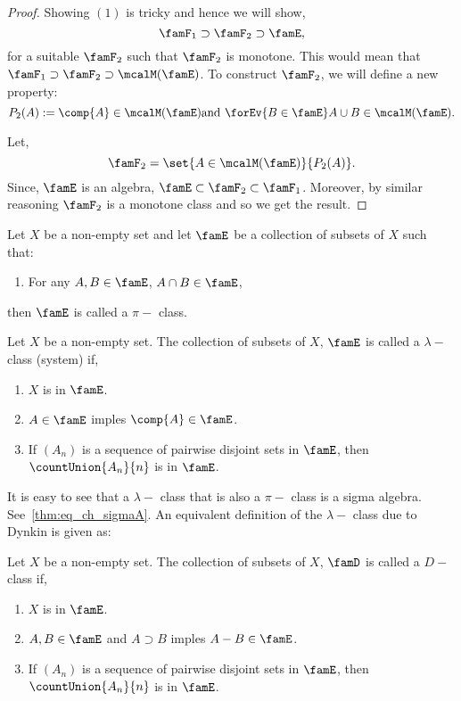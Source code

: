 \begin{proof}
    Showing $(1)$ is tricky and hence we will show,
    \[\famF_1 \supset \famF_2 \supset \famE,\]
    for a suitable $\famF_2$ such that $\famF_2$ is monotone. 
    This would mean that $\famF_1 \supset \famF_2 \supset \mcalM(\famE)$.
    To construct $\famF_2$, we will define a new property:
    \[P_2(A) := \comp{A}\in\mcalM(\famE) \text{and} \hspace{0.05in} 
	\forEv{B\in\famE}A\cup B \in\mcalM(\famE).\]

    Let,
    \[\famF_{2} = \set{A\in\mcalM(\famE)}{P_2(A)}.\]
    Since, $\famE$ is an algebra, $\famE \subset \famF_{2} \subset \famF_{1}$. Moreover, by similar reasoning
    $\famF_{2}$ is a monotone class and so we get the result.
\end{proof}

\begin{Definition}[name=$\pi$ class]
    Let $X$ be a non-empty set and let $\famE$ be a collection of subsets of $X$ such that:
    \begin{enumerate}
	\item For any $A,B \in \famE$, $A\cap B \in \famE$,
    \end{enumerate}
    then $\famE$ is called a $\pi-$ class.
\end{Definition}
\begin{Definition}[name=$\lambda$ class]
    Let $X$ be a non-empty set. The collection of subsets of $X$, $\famE$ is called a $\lambda-$ class 
    (system) if,
    \begin{enumerate}
	\item
	    $X$ is in $\famE$.
	\item
	    $A \in \famE$ imples $\comp{A}\in \famE$.
	\item
	    If $(A_n)$ is a sequence of pairwise disjoint sets in $\famE$, then $\countUnion{A_n}{n}$ is in
	    $\famE$. 
    \end{enumerate}
\end{Definition}
It is easy to see that a $\lambda-$ class that is also a $\pi-$ class is a sigma algebra.
See~\ref{thm:eq_ch_sigmaA}. 
An equivalent definition of the $\lambda-$ class due to Dynkin is given as:
\begin{Definition}[name= $D$ class]
    Let $X$ be a non-empty set. The collection of subsets of $X$, $\famD$ is called a $D-$ class
    if,
    \begin{enumerate}
	\item
	    $X$ is in $\famE$.
	\item
	    $A,B \in \famE$ and $A \supset B$ imples ${A-B}\in \famE$.
	\item
	    If $(A_n)$ is a sequence of pairwise disjoint sets in $\famE$, then $\countUnion{A_n}{n}$ is in
	    $\famE$. 
    \end{enumerate}

\end{Definition}
